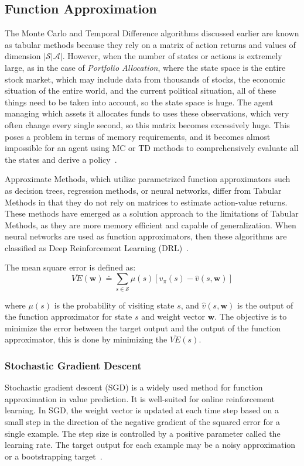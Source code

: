\documentclass[../xlapes02]{subfiles}
\begin{document}
    \subsection{Function Approximation}\label{subsec:function-approximation}
    The Monte Carlo and Temporal Difference algorithms discussed earlier are known as tabular methods because they rely on a matrix of action returns and values of dimension $|\mathcal{S}|\mathcal{A}|$. However, when the number of states or actions is extremely large, as in the case of \emph{Portfolio Allocation}, where the state space is the entire stock market, which may include data from thousands of stocks, the economic situation of the entire world, and the current political situation, all of these things need to be taken into account, so the state space is huge. The agent managing which assets it allocates funds to uses these observations, which very often change every single second, so this matrix becomes excessively huge. This poses a problem in terms of memory requirements, and it becomes almost impossible for an agent using MC or TD methods to comprehensively evaluate all the states and derive a policy~\cite{sutton2018reinforcement, FITMT25127}.

    Approximate Methods, which utilize parametrized function approximators such as decision trees, regression methods, or neural networks, differ from Tabular Methods in that they do not rely on matrices to estimate action-value returns. These methods have emerged as a solution approach to the limitations of Tabular Methods, as they are more memory efficient and capable of generalization. When neural networks are used as function approximators, then these algorithms are classified as Deep Reinforcement Learning (DRL)~\cite{FITMT25127}.

    The mean square error is defined as:
    \begin{equation}
        \overline{VE}(\bm{w})\doteq\sum_{s\in\mathcal{S}}\mu(s)\left[v_{\pi}(s)-\hat{v}(s,\bm{w})\right]
    \end{equation}

    where $\mu(s)$ is the probability of visiting state $s$, and $\hat{v}(s,\bm{w})$ is the output of the function approximator for state $s$ and weight vector $\bm{w}$.
    The objective is to minimize the error between the target output and the output of the function approximator, this is done by minimizing the $\overline{VE}(s)$.

    \subsubsection{Stochastic Gradient Descent}\label{subsubsec:stochastic-gradient-descent}
    Stochastic gradient descent (SGD) is a widely used method for function approximation in value prediction. It is well-suited for online reinforcement learning. In SGD, the weight vector is updated at each time step based on a small step in the direction of the negative gradient of the squared error for a single example. The step size is controlled by a positive parameter called the learning rate. The target output for each example may be a noisy approximation or a bootstrapping target~\cite{sutton2018reinforcement}.
\end{document}
